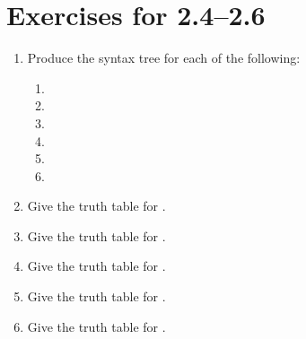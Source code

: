 \section*{Exercises for 2.4--2.6}

\begin{enumerate}

 \item Produce the syntax tree for each of the following:

  \begin{enumerate}

   \item {}

   
   \item {}


   \item {}

   
   \item {}


   \item {}


   \item {}


  \end{enumerate}

 \item Give the truth table for .
  



 \item Give the truth table for .


 \item Give the truth table for .



 \item Give the truth table for .


 \item Give the truth table for .


\end{enumerate}
